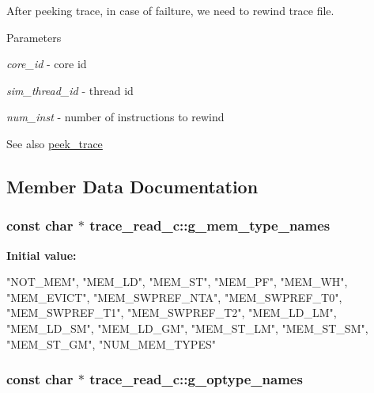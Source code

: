 \label{classtrace__read__c_a15c95901d6feaf0a968aad03858eef4c}
After peeking trace, in case of failture, we need to rewind trace file. 
\begin{DoxyParams}{Parameters}
\item[{\em core\_\-id}]-\/ core id \item[{\em sim\_\-thread\_\-id}]-\/ thread id \item[{\em num\_\-inst}]-\/ number of instructions to rewind \end{DoxyParams}
\begin{DoxySeeAlso}{See also}
\hyperlink{classtrace__read__c_a8f641d8f18e9c7a2be45e500f6f5cec8}{peek\_\-trace} 
\end{DoxySeeAlso}


\subsection{Member Data Documentation}
\hypertarget{classtrace__read__c_a13eedea145a5a0da15a67415d49fb1a0}{
\subsubsection[{g\_\-mem\_\-type\_\-names}]{\setlength{\rightskip}{0pt plus 5cm}const char $\ast$ trace\_\-read\_\-c::g\_\-mem\_\-type\_\-names}}
\label{classtrace__read__c_a13eedea145a5a0da15a67415d49fb1a0}
{\bfseries Initial value:}
\begin{DoxyCode}
 {
  "NOT_MEM",     
  "MEM_LD",       
  "MEM_ST",       
  "MEM_PF",       
  "MEM_WH",       
  "MEM_EVICT",     
  "MEM_SWPREF_NTA", 
  "MEM_SWPREF_T0",
  "MEM_SWPREF_T1",
  "MEM_SWPREF_T2",
  "MEM_LD_LM",
  "MEM_LD_SM",
  "MEM_LD_GM",
  "MEM_ST_LM",
  "MEM_ST_SM",
  "MEM_ST_GM",
  "NUM_MEM_TYPES"
}
\end{DoxyCode}
\hypertarget{classtrace__read__c_ac4d2f34707899a37bf014db6c326ccba}{
\subsubsection[{g\_\-optype\_\-names}]{\setlength{\rightskip}{0pt plus 5cm}const char $\ast$ trace\_\-read\_\-c::g\_\-optype\_\-names}}
